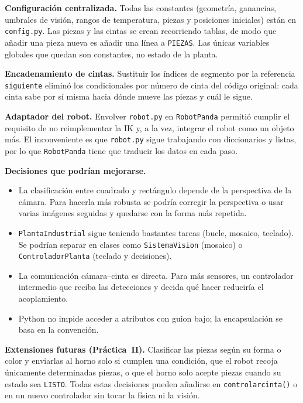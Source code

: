 \documentclass[12pt,a4paper]{article}
\renewcommand{\_}{\guionbajo\allowbreak}
\begin{document}
\textbf{Configuración centralizada.} Todas las constantes (geometría, ganancias, umbrales
de visión, rangos de temperatura, piezas y posiciones iniciales) están en
\texttt{config.py}. Las piezas y las cintas se crean recorriendo tablas, de modo que
añadir una pieza nueva es añadir una línea a \texttt{PIEZAS}. Las únicas variables
globales que quedan son constantes, no estado de la planta.

\textbf{Encadenamiento de cintas.} Sustituir los índices de segmento por la referencia
\texttt{siguiente} eliminó los condicionales por número de cinta del código original:
cada cinta sabe por sí misma hacia dónde mueve las piezas y cuál le sigue.

\textbf{Adaptador del robot.} Envolver \texttt{robot.py} en \texttt{RobotPanda} permitió
cumplir el requisito de no reimplementar la IK y, a la vez, integrar el robot como un objeto
más. El inconveniente es que \texttt{robot.py} sigue trabajando con diccionarios y listas,
por lo que \texttt{RobotPanda} tiene que traducir los datos en cada paso.

\textbf{Decisiones que podrían mejorarse.}
\begin{itemize}
    \item La clasificación entre cuadrado y rectángulo depende de la perspectiva de la
          cámara. Para hacerla más robusta se podría corregir la perspectiva o usar varias
          imágenes seguidas y quedarse con la forma más repetida.
    \item \texttt{PlantaIndustrial} sigue teniendo bastantes tareas (bucle, mosaico,
          teclado). Se podrían separar en clases como \texttt{SistemaVision} (mosaico) o
          \texttt{ControladorPlanta} (teclado y decisiones).
    \item La comunicación cámara--cinta es directa. Para más sensores, un controlador
          intermedio que reciba las detecciones y decida qué hacer reduciría el
          acoplamiento.
    \item Python no impide acceder a atributos con guion bajo; la encapsulación se basa en
          la convención.
\end{itemize}

\textbf{Extensiones futuras (Práctica~II).} Clasificar las piezas según su forma o color
y enviarlas al horno solo si cumplen una condición, que el robot recoja únicamente
determinadas piezas, o que el horno solo acepte piezas cuando su estado sea
\texttt{LISTO}. Todas estas decisiones pueden añadirse en \texttt{\_controlar\_cinta()} o
en un nuevo controlador sin tocar la física ni la visión.
\end{document}
